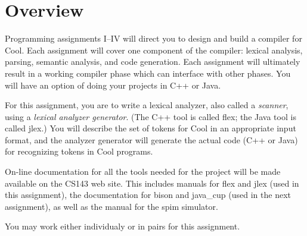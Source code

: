 \documentclass[11pt]{article}
\begin{document}


%
\def\U#1{{\sf{}#1}}
\def\S#1{{\tt{}#1}} %
\def\C#1{{\bf{}#1}}

\newcommand{\Char}[1]{\ensuremath{\fbox{\phantom{$\backslash$}$\!\!\!$#1}\;}}


\section{Overview}

Programming assignments I--IV will direct you to design and build a
compiler for Cool.  Each assignment will cover one component of the
compiler: lexical analysis, parsing, semantic analysis, and code
generation.  Each assignment will ultimately result in a working
compiler phase which can interface with other phases.  You will have an
option of doing your projects in C++ or Java.

For this assignment, you are to write a lexical analyzer, also called a
{\em scanner}, using a {\em lexical analyzer generator}. (The C++ tool is
called \U{flex}; the Java tool is called \U{jlex}.)  You will describe
the set of tokens for Cool in an appropriate input format, and the
analyzer generator will generate the actual code (C++ or Java) for
recognizing tokens in Cool programs.

On-line documentation for all the tools needed for the project will be
made available on the CS143 web site.  This includes manuals for \U{flex}
and \U{jlex} (used in this assignment), the documentation for \U{bison}
and \U{java\_cup} (used in the next assignment), as well as the manual for
the spim simulator.

You may work either individualy or in pairs for this assignment.

\end{document}
